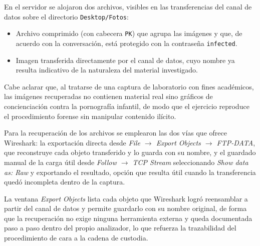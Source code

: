 \begin{respuesta}
  En el servidor se alojaron dos archivos, visibles en las transferencias del canal de datos sobre el directorio \texttt{Desktop/Fotos}:
  \begin{itemize}
    \item {} Archivo comprimido (con cabecera \texttt{PK}) que agrupa las imágenes y que, de acuerdo con la conversación, está protegido con la contraseña \texttt{infected}.
    \item {} Imagen transferida directamente por el canal de datos, cuyo nombre ya resulta indicativo de la naturaleza del material investigado.
  \end{itemize}
  Cabe aclarar que, al tratarse de una captura de laboratorio con fines académicos, las imágenes recuperadas no contienen material real sino gráficos de concienciación contra la pornografía infantil, de modo que el ejercicio reproduce el procedimiento forense sin manipular contenido ilícito.
\end{respuesta}

Para la recuperación de los archivos se emplearon las dos vías que ofrece Wireshark: la exportación directa desde \emph{File $\rightarrow$ Export Objects $\rightarrow$ FTP-DATA}, que reconstruye cada objeto transferido y lo guarda con su nombre, y el guardado manual de la carga útil desde \emph{Follow $\rightarrow$ TCP Stream} seleccionando \emph{Show data as: Raw} y exportando el resultado, opción que resulta útil cuando la transferencia quedó incompleta dentro de la captura.


\begin{analisis}
  La ventana \emph{Export Objects} lista cada objeto que Wireshark logró reensamblar a partir del canal de datos y permite guardarlo con su nombre original, de forma que la recuperación no exige ninguna herramienta externa y queda documentada paso a paso dentro del propio analizador, lo que refuerza la trazabilidad del procedimiento de cara a la cadena de custodia.
\end{analisis}



